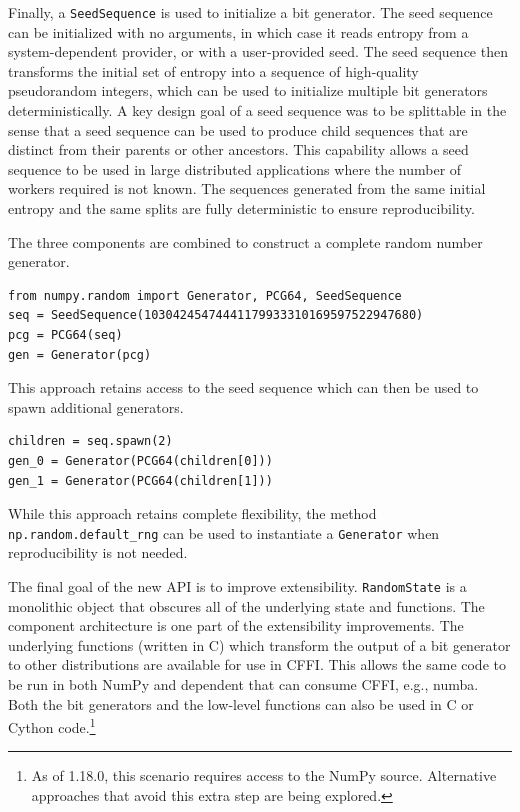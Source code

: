 \documentclass[fleqn,10pt]{wlscirep}
\newcommand{\code}[1]{\texttt{#1}}
\begin{document}
Finally, a \code{SeedSequence} is used to initialize a bit generator. The seed
sequence can be initialized with no arguments, in which case it reads entropy
from a system-dependent provider, or with a user-provided seed. The seed
sequence then transforms the initial set of entropy into a sequence of
high-quality pseudorandom integers, which can be used to initialize multiple bit
generators deterministically. A key design goal of a seed sequence was to be
splittable in the sense that a seed sequence can be used to produce child
sequences that are distinct from their parents or other ancestors. This
capability allows a seed sequence to be used in large distributed applications
where the number of workers required is not known. The sequences generated from
the same initial entropy and the same splits are fully deterministic to ensure
reproducibility.

The three components are combined to construct a complete random number
generator.

\begin{lstlisting}
from numpy.random import Generator, PCG64, SeedSequence
seq = SeedSequence(10304245474441179933310169597522947680)
pcg = PCG64(seq)
gen = Generator(pcg)
\end{lstlisting}

\noindent This approach retains access to the seed sequence which can then be
used to spawn additional generators.

\begin{lstlisting}
children = seq.spawn(2)
gen_0 = Generator(PCG64(children[0]))
gen_1 = Generator(PCG64(children[1]))
\end{lstlisting}

\noindent While this approach retains complete flexibility, the method
\code{np.random.default\_rng} can be used to instantiate a \code{Generator} when
reproducibility is not needed.

The final goal of the new API is to improve extensibility. \code{RandomState} is
a monolithic object that obscures all of the underlying state and functions. The
component architecture is one part of the extensibility improvements. The
underlying functions (written in C) which transform the output of a bit
generator to other distributions are available for use in CFFI. This allows the
same code to be run in both NumPy and dependent that can consume CFFI, e.g.,
numba. Both the bit generators and the low-level functions can also be used in C
or Cython code.\footnote{As of 1.18.0, this scenario requires access to the
NumPy source. Alternative approaches that avoid this extra step are being
explored.} 
\end{document}
